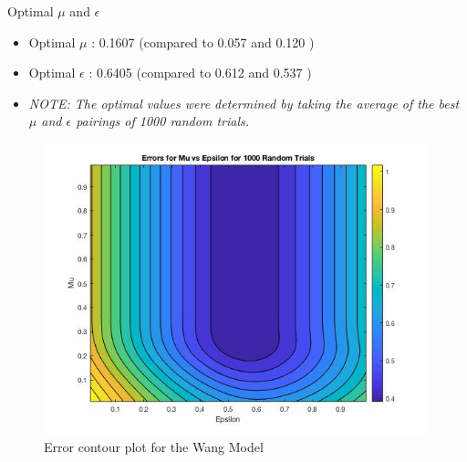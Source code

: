 \begin{frame}{Optimal $\mu$ and $\epsilon$}
   \begin{itemize}
       \item Optimal $\mu$ : 0.1607 (compared to 0.057 \cite{nima1} and 0.120 \cite{nima2})
       \item Optimal $\epsilon$ : 0.6405 (compared to 0.612 \cite{nima1} and 0.537 \cite{nima2})
       \item \textit{NOTE: The optimal values were determined by taking the average of the best $\mu$ and $\epsilon$ pairings of 1000 random trials.}  
   \end{itemize}
    
   \begin{figure}
       \centering
       \includegraphics[scale=0.37]{figures/Contour1000WM.jpg}
       \caption{Error contour plot for the Wang Model}
       \label{fig:ContourWang}
   \end{figure} 
    
    
\end{frame}